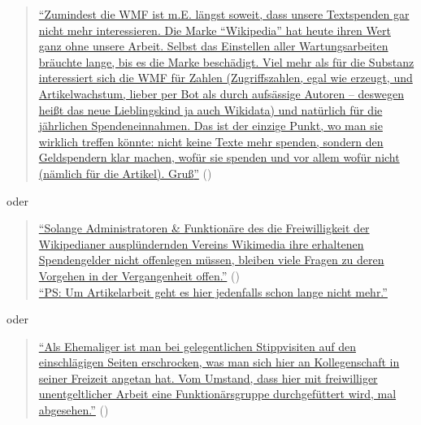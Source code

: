 \documentclass[fontsize=12pt]{scrartcl}
\begin{document}
\singlespacing
\begin{quote}
\href{https://de.wikipedia.org/w/index.php?title=Benutzer_Diskussion:Grillenwaage\&diff=135299468\&oldid=135298878}{"`Zumindest die WMF ist m.E. l\"angst soweit, dass unsere Textspenden gar nicht mehr interessieren. Die Marke "`Wi\-ki\-pe\-dia"' hat heute ihren Wert ganz ohne unsere Arbeit. \mbox{Selbst} das Einstellen aller Wartungsarbei\-ten br\"auchte lange, bis es die Marke besch\"adigt. Viel mehr als f\"ur die Substanz interessiert sich die WMF f\"ur Zahlen (Zugriffszahlen, egal wie erzeugt, und Artikelwachstum, lieber per Bot als durch aufs\"assige Autoren -- deswegen hei{\ss}t das neue Lieblingskind ja auch Wikidata) und nat\"urlich f\"ur die j\"ahrlichen Spendeneinnahmen. Das ist der einzige Punkt, wo man sie wirklich treffen k\"onnte: nicht keine Texte mehr spenden, sondern den Geldspendern klar machen, wof\"ur sie spenden und vor allem wof\"ur nicht (n\"amlich f\"ur die Artikel). Gru{\ss}"'} (\cite{UserMagiers2014a})
\end{quote} 
\onehalfspacing

oder 

\singlespacing
\begin{quote}
\href{https://de.wikipedia.org/w/index.php?title=Benutzer:Simplicius/Diderot-Club_II\&diff=prev\&oldid=135727987}{"`Solange Administratoren \& Funktion\"are des die Freiwilligkeit der Wi\-ki\-pe\-dianer auspl\"undernden Vereins Wikimedia ihre erhaltenen Spendengelder nicht offenlegen m\"ussen, bleiben viele Fragen zu deren Vorgehen in der Vergangenheit offen."'} (\cite{UserReinerStoppok2014}) 
\\\href{https://de.wikipedia.org/w/index.php?title=Benutzer:Simplicius/Diderot-Club_II\&diff=prev\&oldid=135727987}{"`PS: Um \flq Artikelarbeit\frq \,\,geht es \mbox{hier} jedenfalls schon lange nicht mehr."'}
\end{quote} 
\onehalfspacing 

oder 

\singlespacing
\begin{quote}
\href{https://de.wikipedia.org/w/index.php?title=Benutzer:Simplicius/Diderot-Club_II\&curid=4336672\&diff=135838088\&oldid=135786639}{"`Als Ehemaliger ist man bei gelegentlichen Stippvisiten auf den einschl\"agigen Sei\-ten erschrocken, was man sich \mbox{hier} an \flq Kollegenschaft\frq \,\,in seiner Freizeit angetan hat. Vom Umstand, dass \mbox{hier} mit freiwilliger unentgeltlicher Arbeit eine Funktion\"arsgruppe durchgef\"uttert wird, mal abgesehen."'} (\cite{UserJezza2014})
\end{quote} 
\onehalfspacing 
\end{document}
